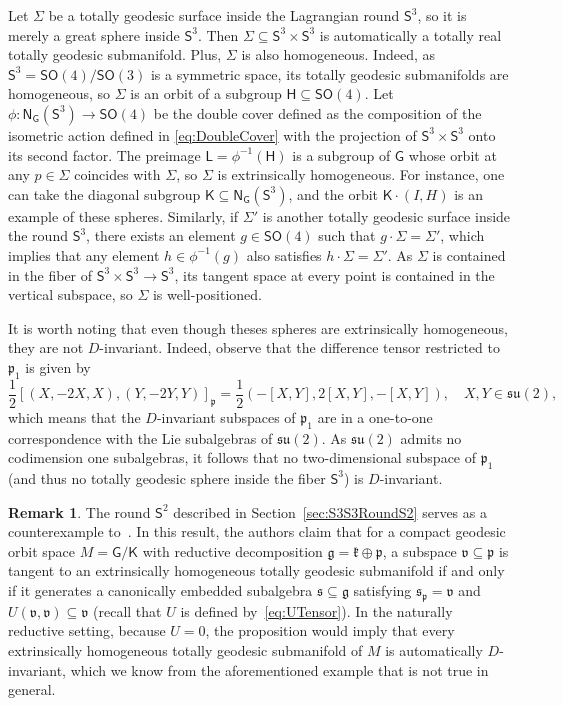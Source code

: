 \documentclass[11pt,a4paper,final]{amsart}
\newcommand{\s}{\mathsf}
\newcommand{\g}{\mathfrak}
\theoremstyle{definition}
\newtheorem{remark}[theorem]{Remark}
\begin{document}
Let $\Sigma$ be a totally geodesic surface inside the Lagrangian round $\mathsf{S}^{3}$, so it is merely a great sphere inside $\mathsf{S}^{3}$.
Then $\Sigma\subseteq \mathsf{S}^{3}\times\mathsf{S}^{3}$ is automatically a totally real totally geodesic submanifold.
Plus, $\Sigma$ is also homogeneous.
Indeed, as $\mathsf{S}^{3}=\mathsf{SO}(4)/\mathsf{SO}(3)$ is a symmetric space, its totally geodesic submanifolds are homogeneous, so $\Sigma$ is an orbit of a subgroup $\mathsf{H}\subseteq \mathsf{SO}(4)$.
Let $\phi \colon \mathsf{N}_{\mathsf{G}}(\mathsf{S}^{3})\to \mathsf{SO}(4)$ be the double cover defined as the composition of the isometric action defined in \eqref{eq:DoubleCover} with the projection of $\mathsf{S}^{3}\times\mathsf{S}^{3}$ onto its second factor.
The preimage $\mathsf{L}=\phi^{-1}(\mathsf{H})$ is a subgroup of $\mathsf{G}$ whose orbit at any $p\in \Sigma$ coincides with $\Sigma$, so $\Sigma$ is extrinsically homogeneous.
For instance, one can take the diagonal subgroup $\s{K}\subseteq \s{N}_{\s{G}}(\s{S}^3)$, and the orbit $\s{K}\cdot (I,H)$ is an example of these spheres.
Similarly, if $\Sigma'$ is another totally geodesic surface inside the round $\mathsf{S}^{3}$, there exists an element $g\in\mathsf{SO}(4)$ such that $g\cdot \Sigma = \Sigma '$, which implies that any element $h\in \phi^{-1}(g)$ also satisfies $h\cdot \Sigma=\Sigma'$.
As $\Sigma$ is contained in the fiber of $\s{S}^{3}\times\s{S}^{3}\to\s{S}^{3}$, its tangent space at every point is contained in the vertical subspace, so $\Sigma$ is well-positioned.


It is worth noting that even though theses spheres are extrinsically homogeneous, they are not $D$-invariant.
Indeed, observe that the difference tensor restricted to $\g{p}_{1}$ is given by
\[
	\frac{1}{2}[(X,-2X,X),(Y,-2Y,Y)]_{\g{p}}=\frac{1}{2}(-[X,Y],2[X,Y],-[X,Y]), \quad X,Y\in\g{su}(2),
\]
which means that the $D$-invariant subspaces of $\g{p}_{1}$ are in a one-to-one correspondence with the Lie subalgebras of $\g{su}(2)$.
As $\g{su}(2)$ admits no codimension one subalgebras, it follows that no two-dimensional subspace of $\g{p}_{1}$ (and thus no totally geodesic sphere inside the fiber $\s{S}^3$) is $D$-invariant.
	
\begin{remark}
	\label{rem:alekseevski-nikonorov}
	The round $\s{S}^{2}$ described in Section~\ref{sec:S3S3RoundS2} serves as a counterexample to~\cite[Proposition~2]{AlekseevskyNikonorov}.
	In this result, the authors claim that for a compact geodesic orbit space $M=\s{G}/\s{K}$ with reductive decomposition $\g{g}=\g{k}\oplus\g{p}$, a subspace $\g{v}\subseteq\g{p}$ is tangent to an extrinsically homogeneous totally geodesic submanifold if and only if it generates a canonically embedded subalgebra $\g{s}\subseteq \g{g}$ satisfying $\g{s}_{\g{p}}=\g{v}$ and $U(\g{v},\g{v})\subseteq \g{v}$ (recall that $U$ is defined by~\eqref{eq:UTensor}).
	In the naturally reductive setting, because $U=0$, the proposition would imply that every extrinsically homogeneous totally geodesic submanifold of $M$ is automatically $D$-invariant, which we know from the aforementioned example that is not true in general.
\end{remark}
\end{document}
